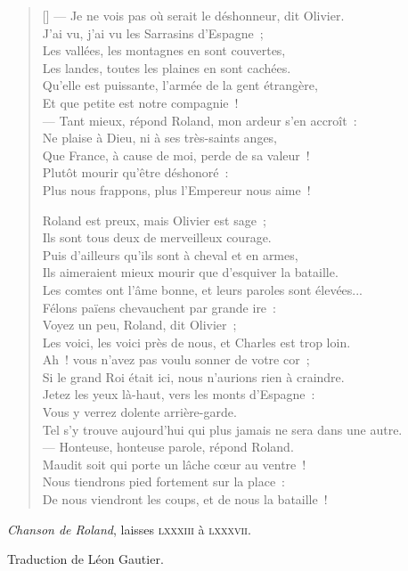 \documentclass[a4paper,14pt,french]{extarticle}
\begin{document}
\begin{verse}[\versewidth]
— Je ne vois pas où serait le déshonneur, dit Olivier.\\
J’ai vu, j’ai vu les Sarrasins d’Espagne ;\\
Les vallées, les montagnes en sont couvertes,\\
Les landes, toutes les plaines en sont cachées.\\
Qu’elle est puissante, l’armée de la gent étrangère,\\
Et que petite est notre compagnie !\\
— Tant mieux, répond Roland, mon ardeur s’en accroît :\\
Ne plaise à Dieu, ni à ses très-saints anges,\\
Que France, à cause de moi, perde de sa valeur !\\
Plutôt mourir qu’être déshonoré :\\
Plus nous frappons, plus l’Empereur nous aime !

Roland est preux, mais Olivier est sage ;\\
Ils sont tous deux de merveilleux courage.\\
Puis d’ailleurs qu’ils sont à cheval et en armes,\\
Ils aimeraient mieux mourir que d’esquiver la bataille.\\
Les comtes ont l’âme bonne, et leurs paroles sont élevées...\\
Félons païens chevauchent par grande ire :\\
Voyez un peu, Roland, dit Olivier ;\\
Les voici, les voici près de nous, et Charles est trop loin.\\
Ah ! vous n’avez pas voulu sonner de votre cor ;\\
Si le grand Roi était ici, nous n’aurions rien à craindre.\\
Jetez les yeux là-haut, vers les monts d’Espagne :\\
Vous y verrez dolente arrière-garde.\\
Tel s’y trouve aujourd’hui qui plus jamais ne sera dans une autre.\\
— Honteuse, honteuse parole, répond Roland.\\
Maudit soit qui porte un lâche cœur au ventre !\\
Nous tiendrons pied fortement sur la place :\\
De nous viendront les coups, et de nous la bataille !
\end{verse}

\begin{flushright}
\large
\textit{Chanson de Roland}, laisses \textsc{lxxxiii} à \textsc{lxxxvii}.

\medskip
\small
Traduction de Léon Gautier.
\end{flushright}
\end{document}
